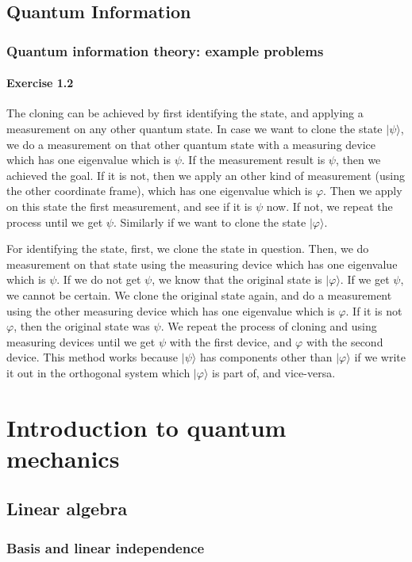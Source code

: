 \documentclass[a4paper,12pt]{article}
\newcommand{\exercise}[1]{\paragraph{Exercise #1}}
\newcommand{\ra}{\rangle}
\begin{document}
    \setcounter{subsection}{5}
    \subsection{Quantum Information}

    \subsubsection{Quantum information theory: example problems}

    \exercise{1.2} The cloning can be achieved by first identifying the state, and applying a measurement on any other quantum state. In case we want to clone the state $| \psi \ra$, we do a measurement on that other quantum state with a measuring device which has one eigenvalue which is $\psi$. If the measurement result is $\psi$, then we achieved the goal. If it is not, then we apply an other kind of measurement (using the other coordinate frame), which has one eigenvalue which is $\varphi$. Then we apply on this state the first measurement, and see if it is $\psi$ now. If not, we repeat the process until we get $\psi$. Similarly if we want to clone the state $| \varphi \ra$.

    For identifying the state, first, we clone the state in question. Then, we do measurement on that state using the measuring device which has one eigenvalue which is $\psi$. If we do not get $\psi$, we know that the original state is $| \varphi \ra$. If we get $\psi$, we cannot be certain. We clone the original state again, and do a measurement using the other measuring device which has one eigenvalue which is $\varphi$. If it is not $\varphi$, then the original state was $\psi$. We repeat the process of cloning and using measuring devices until we get $\psi$ with the first device, and $\varphi$ with the second device. This method works because $| \psi \ra$ has components other than $| \varphi \ra$ if we write it out in the orthogonal system which $| \varphi \ra$ is part of, and vice-versa.

    \section{Introduction to quantum mechanics}

    \subsection{Linear algebra}

    \subsubsection{Basis and linear independence}
\end{document}
